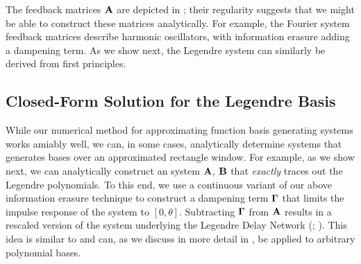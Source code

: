 The feedback matrices $\mathbf{A}$ are depicted in ; their regularity suggests that we might be able to construct these matrices analytically.
For example, the Fourier system feedback matrices describe harmonic oscillators, with information erasure adding a dampening term.
As we show next, the Legendre system can similarly be derived from first principles.

\subsection{Closed-Form Solution for the Legendre Basis}
\label{sec:ldn_derivation}

While our numerical method for approximating function basis generating \LTI systems works amiably well, we can, in some cases, analytically determine \LTI systems that generates bases over an approximated rectangle window.
For example, as we show next, we can analytically construct an \LTI system ${\mathbf{A}}$, ${\mathbf{B}}$ that \emph{exactly} traces out the Legendre polynomials.
To this end, we use a continuous variant of our above information erasure technique to construct a dampening term $\mathbf{\Gamma}$ that limits the impulse response of the system to $[0, \theta]$.
Subtracting $\mathbf{\Gamma}$ from $\mathbf{A}$ results in a rescaled version of the \LTI system underlying the Legendre Delay Network (\LDN; \cite{voelker2018improving}).
This idea is similar to \citet{gu2020hippo} and can, as we discuss in more detail in \citet{stockel2021constructing}, be applied to arbitrary polynomial bases.

